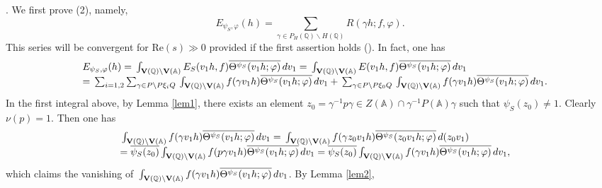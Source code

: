 \documentclass[11pt]{amsart}
\numberwithin{equation}{section}
\theoremstyle{definition}
\begin{document}
. We first prove (2), namely,
$$E_{\psi_S,\varphi}(h)=\sum_{\gamma\in P_H({\mathbb{Q}}){\backslash} H({\mathbb{Q}})}R(\gamma h;f,\varphi).
$$
This series will be convergent for Re$(s)\gg 0$ provided if the first assertion holds (\cite{langlands}). 
In fact, one has 
$$
\begin{array}{ll}
&E_{\psi_S,\varphi}(h)={\displaystyle}\int_{\bold V({\mathbb{Q}})\backslash \bold V({\mathbb{A}})} E_S(v_1h,f)\overline{\Theta^{\psi_S}(v_1h;\varphi)}\, dv_1 ={\displaystyle}\int_{\bold V({\mathbb{Q}})\backslash \bold V({\mathbb{A}})} E(v_1h,f)\overline{\Theta^{\psi_S}(v_1h;\varphi)}\, dv_1 \\
&={\displaystyle}\sum_{i=1,2}\sum_{\gamma\in P{\backslash} P\xi_i Q}{\displaystyle}\int_{\bold V({\mathbb{Q}})\backslash \bold V({\mathbb{A}})}f(\gamma v_1h)
\overline{\Theta^{\psi_S}(v_1h;\varphi)}\, dv_1 +{\displaystyle}\sum_{\gamma\in P{\backslash} P\xi_0 Q}{\displaystyle}\int_{\bold V({\mathbb{Q}})\backslash \bold V({\mathbb{A}})}f(\gamma v_1h)
\overline{\Theta^{\psi_S}(v_1h;\varphi)}\, dv_1. 
\end{array}
$$
In the first integral above, by Lemma \ref{lem1}, there exists an element 
$z_0=\gamma^{-1}p\gamma\in Z({\mathbb{A}})\cap \gamma^{-1}P({\mathbb{A}})\gamma$ such that $\psi_S(z_0)\not=1$. Clearly $\nu(p)=1$.  
Then one has 
$$
\begin{array}{ll}
&{\displaystyle}\int_{\bold V({\mathbb{Q}})\backslash \bold V({\mathbb{A}})}f(\gamma v_1h)
\overline{\Theta^{\psi_S}(v_1h;\varphi)}\, dv_1 = {\displaystyle}\int_{\bold V({\mathbb{Q}})\backslash \bold V({\mathbb{A}})}f(\gamma z_0v_1h)
\overline{\Theta^{\psi_S}(z_0v_1h;\varphi)}\, d(z_0v_1)\\
&=\overline{\psi_S(z_0)}{\displaystyle}\int_{\bold V({\mathbb{Q}})\backslash \bold V({\mathbb{A}})}f(p\gamma v_1h)
\overline{\Theta^{\psi_S}(v_1h;\varphi)}\, dv_1 = \overline{\psi_S(z_0)}{\displaystyle}\int_{\bold V({\mathbb{Q}})\backslash \bold V({\mathbb{A}})}f(\gamma v_1h)
\overline{\Theta^{\psi_S}(v_1h;\varphi)}\, dv_1,
\end{array}
$$
which claims the vanishing of ${\displaystyle}\int_{\bold V({\mathbb{Q}})\backslash \bold V({\mathbb{A}})}f(\gamma v_1h)
\overline{\Theta^{\psi_S}(v_1h;\varphi)}\, dv_1$. 
By Lemma \ref{lem2}, 
\end{document}

